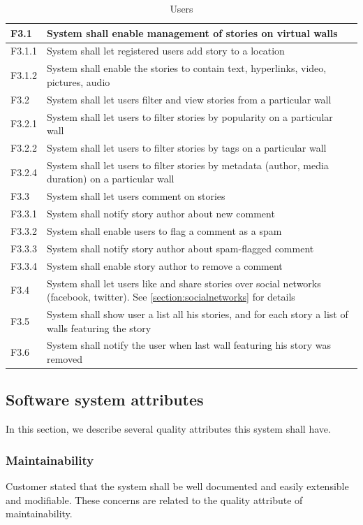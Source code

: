 \documentclass[11pt]{book}
\begin{document}
\begin{table}[H]
\centering
\begin{tabular}{ l  p{11cm} }
F3.1 & System shall enable management of stories on virtual walls\\
\hline
F3.1.1 & System shall let registered users add story to a location\\
\hline
F3.1.2 & System shall enable the stories to contain text, hyperlinks, video, pictures, audio\\
\hline
F3.2 & System shall let users filter and view stories from a particular wall\\
\hline
F3.2.1 & System shall let users to filter stories by popularity on a particular wall\\
\hline
F3.2.2 & System shall let users to filter stories by tags on a particular wall\\
\hline
F3.2.4 & System shall let users to filter stories by metadata (author, media duration) on a particular wall\\
\hline
F3.3 & System shall let users comment on stories\\
\hline
F3.3.1 & System shall notify story author about new comment\\
\hline
F3.3.2 & System shall enable users to flag a comment as a spam\\
\hline
F3.3.3 & System shall notify story author about spam-flagged comment\\
\hline
F3.3.4 & System shall enable story author to remove a comment\\
\hline
F3.4 & System shall let users like and share stories over social networks (facebook, twitter). See \ref{section:socialnetworks} for details\\
\hline
F3.5 & System shall show user a list all his stories, and for each story a list of walls featuring the story\\
\hline
F3.6 & System shall notify the user when last wall featuring his story was removed
\end{tabular}
\label{tab:requirements_users}
\caption{Users}
\end{table}

\subsection{Software system attributes}\label{section:softwaresystemattributes}
In this section, we describe several quality attributes this system shall have.

\subsubsection{Maintainability}
Customer stated that the system shall be well documented and easily extensible and modifiable. These concerns are related to the quality attribute of maintainability.
\end{document}
